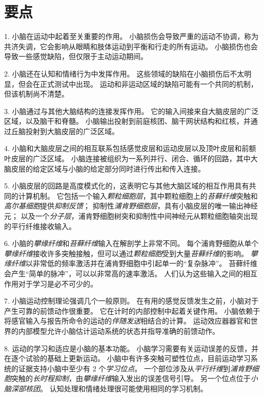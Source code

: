 \section{要点}

1. 小脑在运动中起着至关重要的作用。
小脑损伤会导致严重的运动不协调，称为共济失调，它会影响从眼睛和肢体运动到平衡和行走的所有运动。
小脑损伤也会导致一些感觉缺陷，但仅限于主动运动期间。


2. 小脑还在认知和情绪行为中发挥作用。
这些领域的缺陷在小脑损伤后不太明显，但会在正式测试中出现。
运动和非运动区域的缺陷可能有一个共同的机制，但该机制尚不清楚。


3. 小脑通过与其他大脑结构的连接发挥作用。
它的输入间接来自大脑皮层的广泛区域，以及脑干和脊髓。
小脑输出投射到前庭核团、脑干网状结构和红核，并通过丘脑投射到大脑皮层的广泛区域。


4. 小脑和大脑皮层之间的相互联系包括感觉皮层和运动皮层以及顶叶皮层和前额叶皮层的广泛区域。
小脑连接被组织为一系列并行、闭合、循环的回路，其中大脑皮层的给定区域与小脑的给定部分同时进行传出和传入连接。


5. 小脑皮层的回路是高度模式化的，这表明它与其他大脑区域的相互作用具有共同的计算机制。
它包括一个输入\textit{颗粒细胞层}，其中颗粒细胞上的\textit{苔藓纤维}突触和\textit{高尔基细胞}提供\textit{抑制反馈}；
抑制性\textit{浦肯野细胞层}，具有小脑皮层的唯一输出神经元；
以及一个\textit{分子层}，浦肯野细胞树突和抑制性中间神经元从颗粒细胞轴突出现的平行纤维接收输入。


6. 小脑的\textit{攀缘纤维}和\textit{苔藓纤维}输入在解剖学上非常不同。
每个浦肯野细胞从单个\textit{攀缘纤维}接收许多突触接触，但可以通过\textit{颗粒细胞}受到大量\textit{苔藓纤维}的影响。
\textit{攀缘纤维}以非常低的频率激活并在浦肯野细胞中引起单一的“复杂脉冲”。
苔藓纤维会产生“简单的脉冲”，可以以非常高的速率激活。
人们认为这些输入之间的相互作用对于学习是必不可少的。


7. 小脑运动控制理论强调几个一般原则。
在有用的感觉反馈发生之前，小脑对于产生可靠的前馈动作很重要。
它在计时的内部控制中起着关键作用。
小脑依赖于将感官输入与报告所命令的运动的\textit{伴随发送}相结合的计算。
运动效应器器官和世界的内部模型允许小脑估计运动系统的状态并指导准确的前馈动作。


8. 运动的学习和适应是小脑的基本功能。
小脑学习需要有关运动误差的反馈，并在逐个试验的基础上更新运动。
小脑中有许多突触可塑性位点，目前运动学习系统的证据支持小脑中至少有 2 个\textit{学习位点}。
一个部位涉及从\textit{平行纤维}到\textit{浦肯野细胞}突触的\textit{长时程抑制}，由\textit{攀缘纤维}输入发出的误差信号引导。
另一个位点位于\textit{小脑深部核团}。
认知处理和情绪处理很可能使用相同的学习机制。



